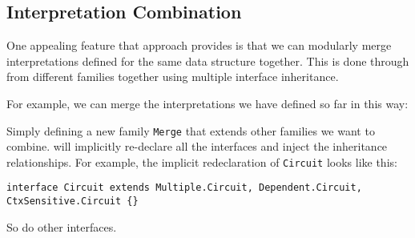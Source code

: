 
\subsection{Interpretation Combination}
One appealing feature that \name approach provides is that we can modularly
merge interpretations defined for the same data structure together.
This is done through from different families
together using multiple interface inheritance.

For example, we can merge the interpretations we have defined so far in this way:

Simply defining a new family \texttt{Merge} that extends other families we want
to combine. \name will implicitly re-declare all the interfaces and inject the
inheritance relationships. For example, the implicit redeclaration of
\texttt{Circuit} looks like this:

\begin{lstlisting}
interface Circuit extends Multiple.Circuit, Dependent.Circuit, CtxSensitive.Circuit {}
\end{lstlisting}

So do other interfaces.

